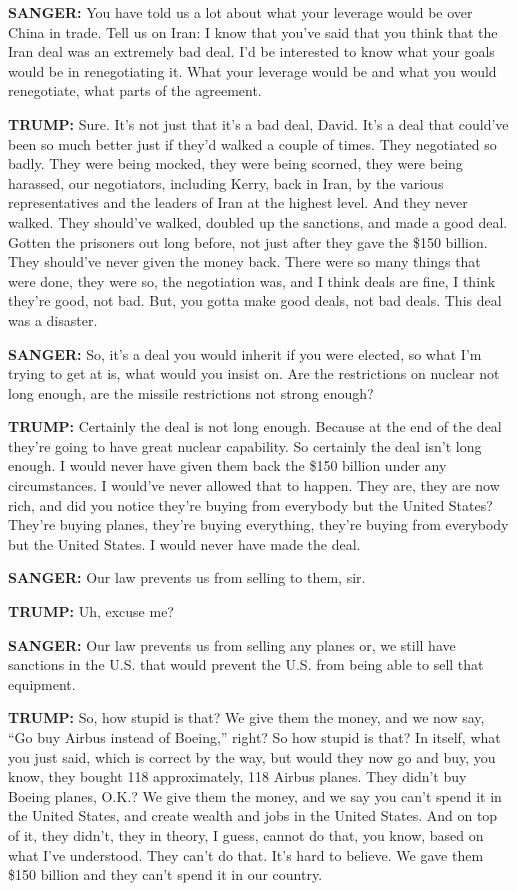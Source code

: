 \textbf{SANGER:} You have told us a lot about what your leverage would
be over China in trade. Tell us on Iran: I know that you've said that
you think that the Iran deal was an extremely bad deal. I'd be
interested to know what your goals would be in renegotiating it. What
your leverage would be and what you would renegotiate, what parts of the
agreement.

\textbf{TRUMP:} Sure. It's not just that it's a bad deal, David. It's a
deal that could've been so much better just if they'd walked a couple of
times. They negotiated so badly. They were being mocked, they were being
scorned, they were being harassed, our negotiators, including Kerry,
back in Iran, by the various representatives and the leaders of Iran at
the highest level. And they never walked. They should've walked, doubled
up the sanctions, and made a good deal. Gotten the prisoners out long
before, not just after they gave the \$150 billion. They should've never
given the money back. There were so many things that were done, they
were so, the negotiation was, and I think deals are fine, I think
they're good, not bad. But, you gotta make good deals, not bad deals.
This deal was a disaster.

\textbf{SANGER:} So, it's a deal you would inherit if you were elected,
so what I'm trying to get at is, what would you insist on. Are the
restrictions on nuclear not long enough, are the missile restrictions
not strong enough?

\textbf{TRUMP:} Certainly the deal is not long enough. Because at the
end of the deal they're going to have great nuclear capability. So
certainly the deal isn't long enough. I would never have given them back
the \$150 billion under any circumstances. I would've never allowed that
to happen. They are, they are now rich, and did you notice they're
buying from everybody but the United States? They're buying planes,
they're buying everything, they're buying from everybody but the United
States. I would never have made the deal.

\textbf{SANGER:} Our law prevents us from selling to them, sir.

\textbf{TRUMP:} Uh, excuse me?

\textbf{SANGER:} Our law prevents us from selling any planes or, we
still have sanctions in the U.S. that would prevent the U.S. from being
able to sell that equipment.

\textbf{TRUMP:} So, how stupid is that? We give them the money, and we
now say, ``Go buy Airbus instead of Boeing,'' right? So how stupid is
that? In itself, what you just said, which is correct by the way, but
would they now go and buy, you know, they bought 118 approximately, 118
Airbus planes. They didn't buy Boeing planes, O.K.? We give them the
money, and we say you can't spend it in the United States, and create
wealth and jobs in the United States. And on top of it, they didn't,
they in theory, I guess, cannot do that, you know, based on what I've
understood. They can't do that. It's hard to believe. We gave them \$150
billion and they can't spend it in our country.

